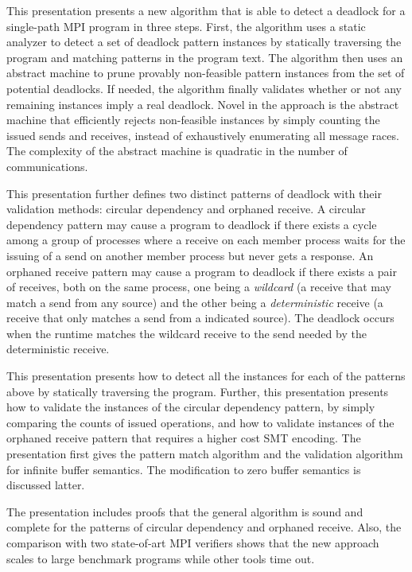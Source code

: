 This presentation presents a new algorithm that is able to detect a deadlock for a single-path MPI program in three steps. First, the algorithm uses a static analyzer to detect a set of deadlock pattern instances by statically traversing the program and matching patterns in the program text. The algorithm then uses an abstract machine to prune provably non-feasible pattern instances from the set of potential deadlocks. If needed, the algorithm finally validates whether or not any remaining instances imply a real deadlock. Novel in the approach is the abstract machine that efficiently rejects non-feasible instances by simply counting the issued sends and receives, instead of exhaustively enumerating all message races. The complexity of the abstract machine is quadratic in the number of communications. 

This presentation further defines two distinct patterns of deadlock with their validation methods: circular dependency and orphaned receive. A circular dependency pattern may cause a program to deadlock if there exists a cycle among a group of processes where a receive on each member process waits for the issuing of a send on another member process but never gets a response. An orphaned receive pattern may cause a program to deadlock if there exists a pair of receives, both on the same process, one being a \emph{wildcard} (a receive that may match a send from any source) and the other being a \emph{deterministic} receive (a receive that only matches a send from a indicated source). The deadlock occurs when the runtime matches the wildcard receive to the send needed by the deterministic receive. 

This presentation presents how to detect all the instances for each of the patterns above by statically traversing the program. Further, this presentation presents how to validate the instances of the circular dependency pattern, by simply comparing the counts of issued operations, and how to validate instances of the orphaned receive pattern that requires a higher cost SMT encoding. The presentation first gives the pattern match algorithm and the validation algorithm for infinite buffer semantics. The modification to zero buffer semantics is discussed latter.  

The presentation includes proofs that the general algorithm is sound and complete for the patterns of circular dependency and orphaned receive. Also, the comparison with two state-of-art MPI verifiers shows that the new approach scales to large benchmark programs while other tools time out.

